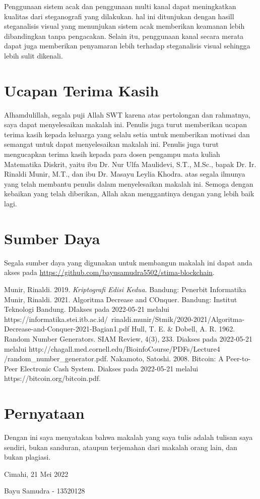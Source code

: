\documentclass[10pt,conference]{IEEEtran}
\theoremstyle{definition}
\begin{document}
Penggunaan sistem acak dan penggunaan multi kanal dapat meningkatkan kualitas dari steganografi yang dilakukan. hal ini ditunjukan dengan hasill steganalisis visual yang menunjukan sistem acak memberikan keamanan lebih
dibandingkan tanpa pengacakan. Selain itu, penggunaan kanal secara merata dapat juga memberikan penyamaran lebih terhadap steganalisis visual sehingga lebih sulit dikenali.

\section*{Ucapan Terima Kasih}
Alhamdulillah, segala puji Allah SWT karena atas pertolongan dan rahmatnya, saya dapat menyelesaikan makalah ini. Penulis juga turut memberikan ucapan terima kasih kepada keluarga yang selalu setia untuk
memberikan motivasi dan semangat untuk dapat menyelesaikan makalah ini. Penulis juga turut mengucapkan terima kasih kepada para dosen pengampu mata kuliah Matematika Diskrit, yaitu ibu Dr. Nur Ulfa Maulidevi, S.T., M.Sc., bapak Dr. Ir.
Rinaldi Munir, M.T., dan ibu Dr. Masayu Leylia Khodra. atas segala ilmunya yang telah membantu penulis dalam menyelesaikan makalah ini. Semoga dengan kebaikan yang telah diberikan, Allah akan menggantinya dengan yang lebih baik lagi.

\section*{Sumber Daya}
Segala sumber daya yang digunakan untuk membangun makalah ini dapat anda akses pada \url{https://github.com/bayusamudra5502/stima-blockchain}.


\begin{thebibliography}{00}
 Munir, Rinaldi. 2019. \emph{Kriptografi Edisi Kedua}. Bandung: Penerbit Informatika 
 Munir, Rinaldi. 2021. Algoritma Decrease and COnquer. Bandung: Institut Teknologi Bandung. DIakses pada 2022-05-21 melalui https://informatika.stei.itb.ac.id/~rinaldi.munir/Stmik/2020-2021/Algoritma-Decrease-and-Conquer-2021-Bagian1.pdf
 Hull, T. E. \& Dobell, A. R. 1962. Random Number Generators. SIAM Review, 4(3), 233. Diakses pada 2022-05-21 melalui http://chagall.med.cornell.edu/BioinfoCourse/PDFs/Lecture4\\
/random\_number\_generator.pdf.
 Nakamoto, Satoshi. 2008. Bitcoin: A Peer-to-Peer Electronic Cash System. Diakses pada 2022-05-21 melalui https://bitcoin.org/bitcoin.pdf.
\end{thebibliography}

\section*{Pernyataan}
Dengan ini saya menyatakan bahwa makalah yang saya tulis adalah tulisan saya sendiri, bukan sanduran, ataupun terjemahan dari makalah orang lain, dan bukan plagiasi.


\vspace{20px}
\hspace*{\fill} Cimahi, 21 Mei 2022

\vspace{50px}
\hspace*{\fill} Bayu Samudra - 13520128
\end{document}
